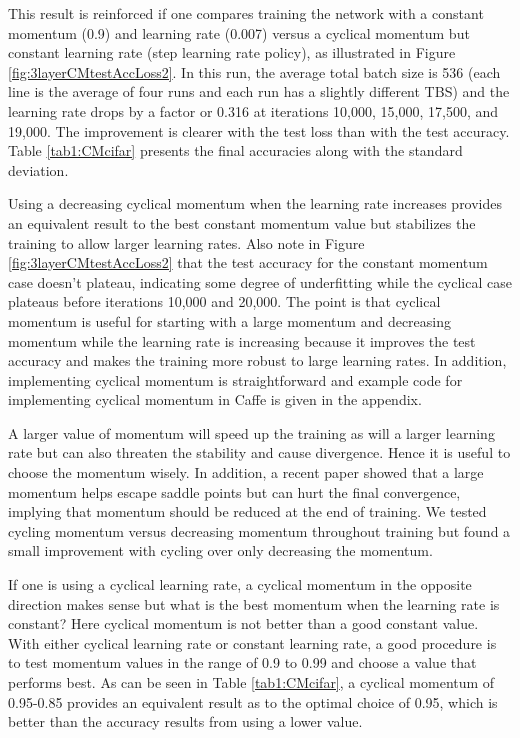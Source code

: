 \documentclass{article} %
\begin{document}
This result is reinforced if one compares training the network with a constant momentum (0.9) and learning rate (0.007) versus a cyclical momentum but constant learning rate (step learning rate policy), as illustrated in Figure \ref{fig:3layerCMtestAccLoss2}.  In this run, the average total batch size is 536 (each line is the average of four runs and each run has a slightly different TBS) and the learning rate drops by a factor or 0.316 at iterations 10,000, 15,000, 17,500, and 19,000.  The improvement is clearer with the test loss than with the test accuracy.  Table \ref*{tab1:CMcifar} presents the final accuracies along with the standard deviation.  

Using a decreasing cyclical momentum when the learning rate increases provides an equivalent result to the best constant momentum value but stabilizes the training to allow larger learning rates.  Also note in Figure \ref{fig:3layerCMtestAccLoss2} that the test accuracy for the constant momentum case doesn't plateau, indicating some degree of underfitting while the cyclical case plateaus before iterations 10,000 and 20,000.  The point is that cyclical momentum is useful for starting with a large momentum and decreasing momentum while the learning rate is increasing because it improves the test accuracy and makes the training more robust to large learning rates.  In addition, implementing cyclical momentum is straightforward and example code for implementing cyclical momentum in Caffe is given in the appendix.

A larger value of momentum will speed up the training as will a larger learning rate but can also threaten the stability and cause divergence.  Hence it is useful to choose the momentum wisely.  In addition, a recent paper \citep{liu2018toward} showed that a large momentum helps escape saddle points but can hurt the final convergence, implying that momentum should be reduced at the end of training.  We tested cycling momentum versus decreasing momentum throughout training but found a small improvement with cycling over only decreasing the momentum.

If one is using a cyclical learning rate, a cyclical momentum in the opposite direction makes sense but what is the best momentum when the learning rate is constant? Here cyclical momentum is not better than a good constant value. With either cyclical learning rate or constant learning rate, a good procedure is to test momentum values in the range of 0.9 to 0.99  and choose a value that performs best.  As can be seen in Table \ref{tab1:CMcifar}, a cyclical momentum of 0.95-0.85 provides an equivalent result as to the optimal choice of 0.95, which is better than the accuracy results from using a lower value.  
\end{document}
